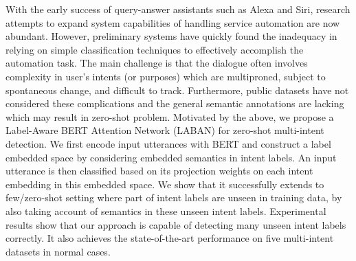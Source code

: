 With the early success of query-answer assistants such as Alexa and Siri, research attempts to expand system capabilities of handling service automation are now abundant. However, preliminary systems have quickly found the inadequacy in relying on simple classification techniques to effectively accomplish the automation task. The main challenge is that the dialogue often involves complexity in user's intents (or purposes) which are multiproned, subject to spontaneous change, and difficult to track. Furthermore, public datasets have not considered these complications and the general semantic annotations are lacking which may result in zero-shot problem. Motivated by the above, we propose a Label-Aware BERT Attention Network (LABAN) for zero-shot multi-intent detection. We first encode input utterances with BERT and construct a label embedded space by considering embedded semantics in intent labels. An input utterance is then classified based on its projection weights on each intent embedding in this embedded space. We show that it successfully extends to few/zero-shot setting where part of intent labels are unseen in training data, by also taking account of semantics in these unseen intent labels. Experimental results show that our approach is capable of detecting many unseen intent labels correctly.  It also achieves the state-of-the-art performance on five multi-intent datasets in normal cases.
